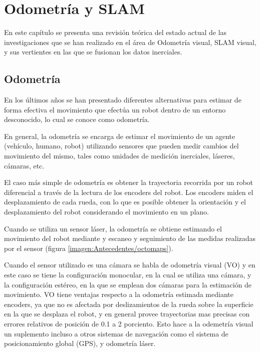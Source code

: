 \chapter{Odometría y SLAM}
\label{capitulo2}

En este capítulo se presenta una revisión teórica del estado actual de las investigaciones que se han realizado en el área de Odometría visual, SLAM visual, y sus vertientes en las que se fusionan los datos inerciales.

\section{Odometría}

En los últimos años se han presentado diferentes alternativas para estimar de forma efectiva el movimiento que efectúa un robot dentro de un entorno desconocido, lo cual se conoce como odometría.

En general, la odometría se encarga de estimar el movimiento de un agente (vehículo, humano, robot) utilizando sensores que pueden medir cambios del movimiento del mismo, tales como unidades de medición inerciales, láseres, cámaras, etc.

El caso más simple de odometría es obtener la trayectoria recorrida por un robot diferencial a través de la lectura de los encoders del robot. Los encoders miden el desplazamiento de cada rueda, con lo que es posible obtener la orientación y el desplazamiento del robot considerando el movimiento en un plano.

Cuando se utiliza un sensor láser, la odometría se obtiene estimando el movimiento del robot mediante y escaneo y seguimiento de las medidas realizadas por el sensor (figura \ref{imagen:Antecedentes/octomaps}).

Cuando el sensor utilizado es una cámara se habla de odometría visual (VO) y en este caso se tiene la configuración monocular, en la cual se utiliza una cámara, y la configuración estéreo, en la que se emplean dos cámaras para la estimación de movimiento. VO tiene ventajas respecto a la odometría estimada mediante encoders, ya que no es afectada por deslizamientos de la rueda sobre la superficie en la que se desplaza el robot, y en general provee trayectorias mas precisas con errores relativos de posición de 0.1 a 2 porciento. Esto hace a la odemetría visual un suplemento incluso a otros sistemas de navegación como el sistema de posicionamiento global (GPS), y odometría láser.

